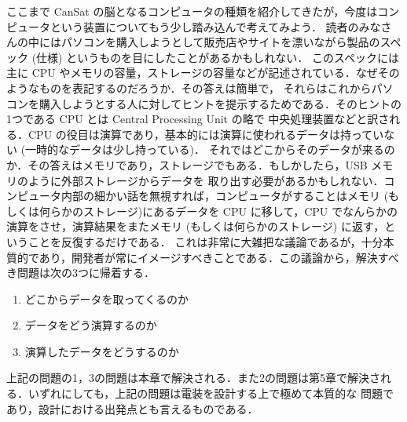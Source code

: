 \documentclass[dvipdfmx]{jsarticle}
\begin{document}
ここまで CanSat の脳となるコンピュータの種類を紹介してきたが，今度はコンピュータという装置についてもう少し踏み込んで考えてみよう．
読者のみなさんの中にはパソコンを購入しようとして販売店やサイトを漂いながら製品のスペック (仕様) というものを目にしたことがあるかもしれない．
このスペックには主に CPU やメモリの容量，ストレージの容量などが記述されている．なぜそのようなものを表記するのだろうか．その答えは簡単で，
それらはこれからパソコンを購入しようとする人に対してヒントを提示するためである．そのヒントの1つである CPU とは Central Processing Unit の略で
中央処理装置などと訳される．CPU の役目は演算であり，基本的には演算に使われるデータは持っていない (一時的なデータは少し持っている)．
それではどこからそのデータが来るのか．その答えはメモリであり，ストレージでもある．もしかしたら，USB メモリのように外部ストレージからデータを
取り出す必要があるかもしれない．コンピュータ内部の細かい話を無視すれば，コンピュータがすることはメモリ (もしくは何らかのストレージ)にあるデータを
 CPU に移して，CPU でなんらかの演算をさせ，演算結果をまたメモリ (もしくは何らかのストレージ) に返す，ということを反復するだけである．
これは非常に大雑把な議論であるが，十分本質的であり，開発者が常にイメージすべきことである．この議論から，解決すべき問題は次の3つに帰着する．
\begin{enumerate}
  \item どこからデータを取ってくるのか
  \item データをどう演算するのか
  \item 演算したデータをどうするのか
\end{enumerate}
上記の問題の1，3の問題は本章で解決される．また2の問題は第5章で解決される．いずれにしても，上記の問題は電装を設計する上で極めて本質的な
問題であり，設計における出発点とも言えるものである．
\end{document}
